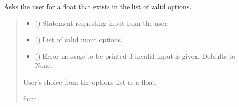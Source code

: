 \documentclass[letterpaper,10pt,english]{sphinxmanual}
\begin{document}
\begin{fulllineitems}
\begin{fulllineitems}
\label{\detokenize{GetUserInput:GetUserInput.UserInput.AskForFloatInList}}
\pysigstartsignatures
{}
\pysigstopsignatures
\sphinxAtStartPar
Asks the user for a float that exists in the list of valid options.
\begin{quote}\begin{description}
\begin{itemize}
\item {} 
\sphinxAtStartPar
{} () \textendash{} Statement requesting input from the user.

\item {} 
\sphinxAtStartPar
{} () \textendash{} List of valid input options.

\item {} 
\sphinxAtStartPar
{} (\sphinxstyleliteralemphasis{\sphinxupquote{ | }}\sphinxstyleliteralemphasis{\sphinxupquote{, }}) \textendash{} Error message to be printed if invalid input is given.                 Defaults to None.

\end{itemize}

\sphinxAtStartPar
User’s choice from the options list as a float.

\sphinxAtStartPar
float

\end{description}\end{quote}

\end{fulllineitems}


\end{fulllineitems}
\end{document}
